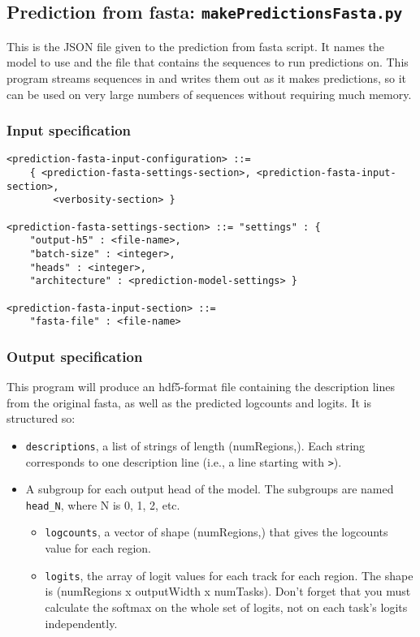 \documentclass{article}
\begin{document}
\newpage

\subsection{Prediction from fasta: \texttt{makePredictionsFasta.py}}

This is the JSON file given to the prediction from fasta script. It names the model to use and the file that contains the sequences to run predictions on.
This program streams sequences in and writes them out as it makes predictions, so it can be used on very large numbers of sequences without requiring much memory. 

\subsubsection{Input specification}

\begin{lstlisting}
<prediction-fasta-input-configuration> ::=
    { <prediction-fasta-settings-section>, <prediction-fasta-input-section>,
        <verbosity-section> }

<prediction-fasta-settings-section> ::= "settings" : {
    "output-h5" : <file-name>,
    "batch-size" : <integer>,
    "heads" : <integer>,
    "architecture" : <prediction-model-settings> }

<prediction-fasta-input-section> ::=
    "fasta-file" : <file-name>
\end{lstlisting}

\subsubsection{Output specification}

This program will produce an hdf5-format file containing the description lines from the original fasta, as well as the predicted logcounts and logits.
It is structured so:

\begin{itemize}
    \item \texttt{descriptions}, a list of strings of length (numRegions,). Each string corresponds to one description line (i.e., a line starting with \texttt{>}).
    \item A subgroup for each output head of the model. The subgroups are named \texttt{head\_N}, where N is 0, 1, 2, etc.
        \begin{itemize}
            \item \texttt{logcounts}, a vector of shape (numRegions,) that gives the logcounts value for each region.
            \item \texttt{logits}, the array of logit values for each track for each region. The shape is (numRegions x outputWidth x numTasks). Don't forget that you must calculate the softmax on the whole set of logits, not on each task's logits independently.
        \end{itemize}
\end{itemize}
\end{document}
